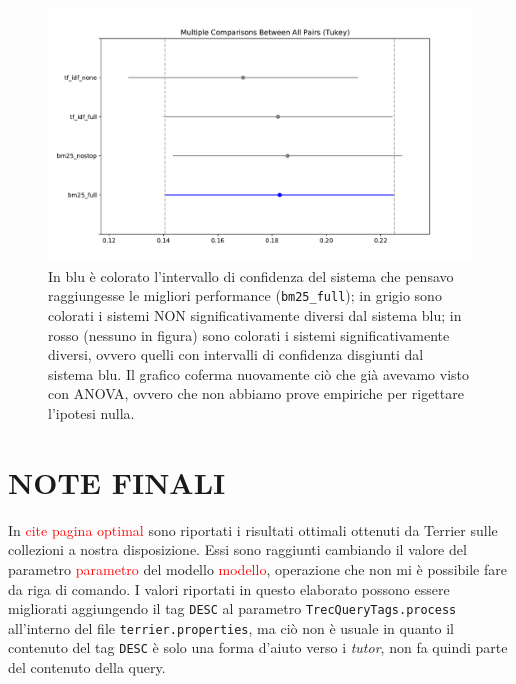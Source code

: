 \documentclass[letterpaper, 10 pt, conference]{ieeeconf}  %
\newcommand\todo[1]{\textcolor{red}{#1}}
\begin{document}
\begin{figure}[h!]
    \centering
    \includegraphics[scale=0.4]{figures/tukey_maps.pdf}
    
    \caption{In blu è colorato l'intervallo di confidenza del sistema che pensavo raggiungesse le migliori performance (\texttt{bm25\_full}); in grigio sono colorati i sistemi NON significativamente diversi dal sistema blu; in rosso (nessuno in figura) sono colorati i sistemi significativamente diversi, ovvero quelli con intervalli di confidenza disgiunti dal sistema blu. Il grafico coferma nuovamente ciò che già avevamo visto con ANOVA, ovvero che non abbiamo prove empiriche per rigettare l'ipotesi nulla.}
    \label{fig:tukey_maps}
\end{figure}

\section{NOTE FINALI}
In \todo{cite pagina optimal}\cite{optimal} sono riportati i risultati ottimali ottenuti da Terrier sulle collezioni a nostra disposizione. Essi sono raggiunti cambiando il valore del parametro \todo{parametro} del modello \todo{modello}, operazione che non mi è possibile fare da riga di comando.   
I valori riportati in questo elaborato possono essere migliorati aggiungendo il tag \texttt{DESC} al parametro \texttt{TrecQueryTags.process} all'interno del file \texttt{terrier.properties}, ma ciò non è usuale in quanto il contenuto del tag \texttt{DESC} è solo una forma d'aiuto verso i \textit{tutor}, non fa quindi parte del contenuto della query.

\addtolength{\textheight}{-12cm}   %
\end{document}
